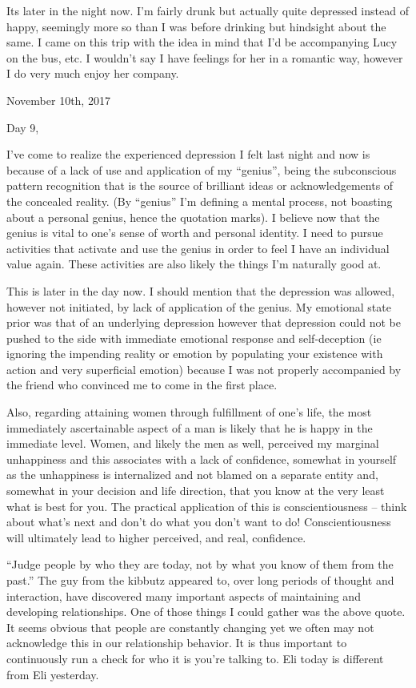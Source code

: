 Its later in the night now. I'm fairly drunk but actually quite
depressed instead of happy, seemingly more so than I was before drinking
but hindsight about the same. I came on this trip with the idea in mind
that I'd be accompanying Lucy on the bus, etc. I wouldn't say I have
feelings for her in a romantic way, however I do very much enjoy her
company.

\bigskip
\bigskip
November 10th, 2017

Day 9,

I've come to realize the experienced depression I felt last night and
now is because of a lack of use and application of my ``genius'', being
the subconscious pattern recognition that is the source of brilliant
ideas or acknowledgements of the concealed reality. (By ``genius'' I'm
defining a mental process, not boasting about a personal genius, hence
the quotation marks). I believe now that the genius is vital to one's
sense of worth and personal identity. I need to pursue activities that
activate and use the genius in order to feel I have an individual value
again. These activities are also likely the things I'm naturally good
at.

This is later in the day now. I should mention that the depression was
allowed, however not initiated, by lack of application of the genius. My
emotional state prior was that of an underlying depression however that
depression could not be pushed to the side with immediate emotional
response and self-deception (ie ignoring the impending reality or
emotion by populating your existence with action and very superficial
emotion) because I was not properly accompanied by the friend who
convinced me to come in the first place.

Also, regarding attaining women through fulfillment of one's life, the
most immediately ascertainable aspect of a man is likely that he is
happy in the immediate level. Women, and likely the men as well,
perceived my marginal unhappiness and this associates with a lack of
confidence, somewhat in yourself as the unhappiness is internalized and
not blamed on a separate entity and, somewhat in your decision and life
direction, that you know at the very least what is best for you. The
practical application of this is conscientiousness -- think about what's
next and don't do what you don't want to do! Conscientiousness will
ultimately lead to higher perceived, and real, confidence.

``Judge people by who they are today, not by what you know of them from
the past.'' The guy from the kibbutz appeared to, over long periods of
thought and interaction, have discovered many important aspects of
maintaining and developing relationships. One of those things I could
gather was the above quote. It seems obvious that people are constantly
changing yet we often may not acknowledge this in our relationship
behavior. It is thus important to continuously run a check for who it is
you're talking to. Eli today is different from Eli yesterday.

